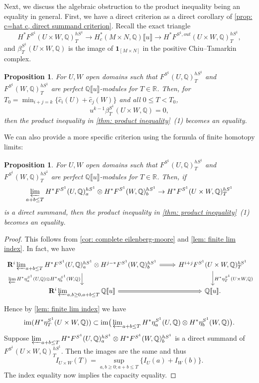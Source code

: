 \documentclass[11pt]{amsart}
\numberwithin{equation}{section}
\theoremstyle{plain}
\newtheorem{Prop}[prop]{Proposition}
\theoremstyle{definition}
\theoremstyle{remark}
\newcommand{\bQ} { {\mathbb{Q}}}
\newcommand{\bR} { {\mathbb{R}}}
\newcommand{\fpw}[1]{{\llbracket #1\rrbracket}}
\newcommand\im{ {\operatorname{im}} }
\begin{document}
Next, we discuss the algebraic obstruction to the product inequality being an equality in general. First, we have a direct criterion as a direct corollary of \autoref{prop: c=hat c, direct summand criterion}. Recall the exact triangle
\[H^*F^{S^1}(U \times W, \bQ)_T^{hS^1} \to H_c^*(M \times N,  \bQ)\fpw{u} \to H^*F^{S^1,out}(U \times W, \bQ)_T^{hS^1},\]
and $\beta_T^{S^1}(U\times W, \bQ)$ is the image of $\mathbf{1}_{[M\times N]}$ in the positive Chiu--Tamarkin complex.
\begin{Prop}\label{prop: product equality 1}
For $U, W$ open domains such that $F^{S^1}(U, \bQ)_T^{hS^1}$ and $F^{S^1}(W,\bQ)_T^{hS^1}$ are perfect $\bQ\fpw{u}$-modules for $T \in \bR$. Then, for $T_0 = \min_{i+j=k}\{\widehat c_i(U) + \widehat c_j(W)\}$ and all $0\leq T < T_0$,
\[u^{k-1}\beta_{T}^{S^1}(U \times W, \bQ) = 0,\]
then the product inequality in \autoref{thm: product inequality}~(1) becomes an equality.
\end{Prop}

We can also provide a more specific criterion using the formula of finite homotopy limits:

\begin{Prop}\label{prop: product equality summand}
For $U, W$ open domains such that $F^{S^1}(U, \bQ)_T^{hS^1}$ and $F^{S^1}(W,\bQ)_T^{hS^1}$ are perfect $\bQ\fpw{u}$-modules for $T \in \bR$. Then, if 
\[\varprojlim_{a+b\leq T}H^*F^{S^1}(U, \bQ)_a^{hS^1} \otimes H^*F^{S^1}(W, \bQ)_b^{hS^1} \to H^*F^{S^1}(U \times W, \bQ)^{hS^1}_T\]
is a direct summand, then the product inequality in \autoref{thm: product inequality}~(1) becomes an equality.
\end{Prop}
\begin{proof}
This follows from \autoref{cor: complete eilenberg-moore} and \autoref{lem: finite lim index}. In fact, we have
\[\begin{tikzcd}
{\mathbf{R}^i\varprojlim_{a+b\leq T}H^*F^{S^1}(U, \bQ)_a^{hS^1} \otimes H^{j-*}F^{S^1}(W, \bQ)_b^{hS^1}} \ar[r, Rightarrow] \ar[d,"{\varprojlim H^*\eta_a^{S^1}(U,\bQ) \otimes H^*\eta_b^{S^1}(W,\bQ)}" left] & {H^{i+j}F^{S^1}(U \times W, \bQ)^{hS^1}_T} \ar[d,"{H^*\eta_T^{S^1}(U\times W, \bQ)}"] \\
{\mathbf{R}^i\varprojlim_{a,b\geq 0,a+b\leq T}\bQ\fpw{u}} \ar[r, Rightarrow] & {\bQ\fpw{u}.}
\end{tikzcd}\]
Hence by \autoref{lem: finite lim index} we have
\[\im(H^*\eta_T^{S^1}(U\times W, \bQ)) \subset \im\big(\varprojlim\nolimits_{a+b\leq T} H^*\eta_a^{S^1}(U,\bQ) \otimes H^*\eta_b^{S^1}(W,\bQ)\big).\]
Suppose $\varprojlim_{a+b\leq T} H^*F^{S^1}(U,\bQ)_a^{hS^1} \otimes H^*F^{S^1}(W,\bQ)_b^{hS^1}$ is a direct summand of $F^{S^1}(U \times W, \bQ)_T^{hS^1}$. Then the images are the same and thus
\[I_{U\times W}(T) = \sup_{a,b\geq 0;a+b\leq T}\{I_U(a) + I_W(b)\}.\]
The index equality now implies the capacity equality.
\end{proof}
\end{document}
